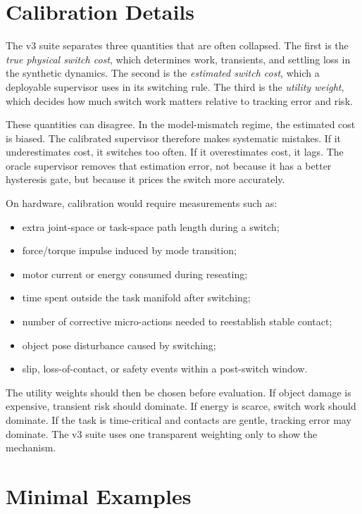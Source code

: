 \documentclass{article}
\begin{document}
\section{Calibration Details}

The v3 suite separates three quantities that are often collapsed.
The first is the \emph{true physical switch cost}, which determines work, transients, and settling loss in the synthetic dynamics.
The second is the \emph{estimated switch cost}, which a deployable supervisor uses in its switching rule.
The third is the \emph{utility weight}, which decides how much switch work matters relative to tracking error and risk.

These quantities can disagree.
In the model-mismatch regime, the estimated cost is biased.
The calibrated supervisor therefore makes systematic mistakes.
If it underestimates cost, it switches too often.
If it overestimates cost, it lags.
The oracle supervisor removes that estimation error, not because it has a better hysteresis gate, but because it prices the switch more accurately.

On hardware, calibration would require measurements such as:
\begin{itemize}
    \item extra joint-space or task-space path length during a switch;
    \item force/torque impulse induced by mode transition;
    \item motor current or energy consumed during reseating;
    \item time spent outside the task manifold after switching;
    \item number of corrective micro-actions needed to reestablish stable contact;
    \item object pose disturbance caused by switching;
    \item slip, loss-of-contact, or safety events within a post-switch window.
\end{itemize}

The utility weights should then be chosen before evaluation.
If object damage is expensive, transient risk should dominate.
If energy is scarce, switch work should dominate.
If the task is time-critical and contacts are gentle, tracking error may dominate.
The v3 suite uses one transparent weighting only to show the mechanism.

\section{Minimal Examples}
\end{document}
